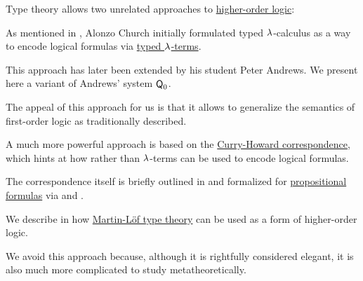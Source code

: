 \begin{remark}\label{rem:higher_order_logic_and_type_theory}
  Type theory allows two unrelated approaches to \hyperref[con:higher_order_logic]{higher-order logic}:
  \begin{thmenum}
     As mentioned in , Alonzo Church initially formulated typed \( {\mathrm \lambda} \)-calculus as a way to encode logical formulas via \hyperref[def:typed_lambda_term]{typed \( {\mathrm \lambda} \)-terms}.

    This approach has later been extended by his student Peter Andrews. We present here a variant of Andrews' system \( \textsf{Q}_0 \).

    The appeal of this approach for us is that it allows to generalize the semantics of first-order logic as traditionally described.

     A much more powerful approach is based on the \hyperref[con:curry_howard_correspondence]{Curry-Howard correspondence}, which hints at how  rather than \( {\mathrm \lambda} \)-terms can be used to encode logical formulas.

    The correspondence itself is briefly outlined in  and formalized for \hyperref[def:propositional_syntax/formula]{propositional formulas} via  and .

    We describe in  how \hyperref[def:mltt]{Martin-L\"of type theory} can be used as a form of higher-order logic.

    We avoid this approach because, although it is rightfully considered elegant, it is also much more complicated to study metatheoretically.
  \end{thmenum}
\end{remark}

